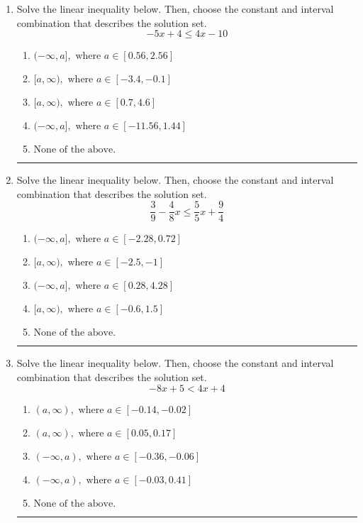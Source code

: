 \documentclass[14pt]{extbook}
\newcommand{\litem}[1]{\item#1\hspace*{-1cm}\rule{\textwidth}{0.4pt}}
\begin{document}
\begin{enumerate}
\litem{
Solve the linear inequality below. Then, choose the constant and interval combination that describes the solution set.\[ -5x + 4 \leq 4x -10 \]\begin{enumerate}[label=\Alph*.]
\item \( (-\infty, a], \text{ where } a \in [0.56, 2.56] \)
\item \( [a, \infty), \text{ where } a \in [-3.4, -0.1] \)
\item \( [a, \infty), \text{ where } a \in [0.7, 4.6] \)
\item \( (-\infty, a], \text{ where } a \in [-11.56, 1.44] \)
\item \( \text{None of the above}. \)

\end{enumerate} }
\litem{
Solve the linear inequality below. Then, choose the constant and interval combination that describes the solution set.\[ \frac{3}{9} - \frac{4}{8} x \leq \frac{5}{5} x + \frac{9}{4} \]\begin{enumerate}[label=\Alph*.]
\item \( (-\infty, a], \text{ where } a \in [-2.28, 0.72] \)
\item \( [a, \infty), \text{ where } a \in [-2.5, -1] \)
\item \( (-\infty, a], \text{ where } a \in [0.28, 4.28] \)
\item \( [a, \infty), \text{ where } a \in [-0.6, 1.5] \)
\item \( \text{None of the above}. \)

\end{enumerate} }
\litem{
Solve the linear inequality below. Then, choose the constant and interval combination that describes the solution set.\[ -8x + 5 < 4x + 4 \]\begin{enumerate}[label=\Alph*.]
\item \( (a, \infty), \text{ where } a \in [-0.14, -0.02] \)
\item \( (a, \infty), \text{ where } a \in [0.05, 0.17] \)
\item \( (-\infty, a), \text{ where } a \in [-0.36, -0.06] \)
\item \( (-\infty, a), \text{ where } a \in [-0.03, 0.41] \)
\item \( \text{None of the above}. \)


\end{enumerate}}
\end{enumerate}
\end{document}
